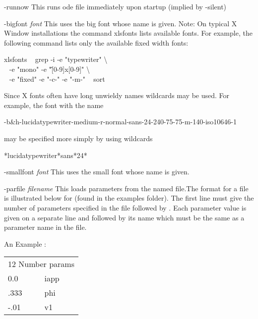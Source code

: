 \begin{description}
\item{-runnow} This runs ode file immediately upon startup (implied by -silent)
\item{-bigfont \emph{font}} This uses the big font whose name is given. Note:  On  typical  X  Window  installations the command xlsfonts lists
       available fonts.  For example, the following  command  lists  only  the
       available fixed width fonts:
\begin{center}\ttfamily\begin{minipage}{55ex}
              xlsfonts \textbar~ grep -i -e "typewriter" \textbackslash \\
                     $~~$ -e "mono" -e "\^[0-9]x[0-9]" \textbackslash \\
                     $~~$ -e "fixed" -e "-c-" -e "-m-" \textbar~ sort
\end{minipage}\end{center}
Since X fonts often have long unwieldy names wildcards may be used.  For example, the font with the name
\begin{center}\ttfamily
	-b\&h-lucidatypewriter-medium-r-normal-sans-24-240-75-75-m-140-iso10646-1
\end{center}
may be specified more simply by using wildcards
\begin{center}\ttfamily
*lucidatypewriter*sans*24*
\end{center}
\item{-smallfont \emph{font}} This uses the small font whose name is given.
\item{-parfile \emph{filename}} This loads parameters from the named file.The format for a {} file is illustrated below for {} (found in the examples {} folder).  The first line must give the number of parameters specified in the file followed by {}.  Each parameter value is given on a separate line and followed by its name which must be the same as a parameter name in the {} file. 
\begin{center}
\begin{minipage}{55ex}
\begin{center}An Example {}:
\end{center}\ttfamily
\begin{tabular}{ll}
\multicolumn{2}{l}{12 Number params}\\
0.0 & iapp\\
.333 & phi\\
-.01 & v1\\

\end{tabular}
\end{minipage}
\end{center}
\end{description}
